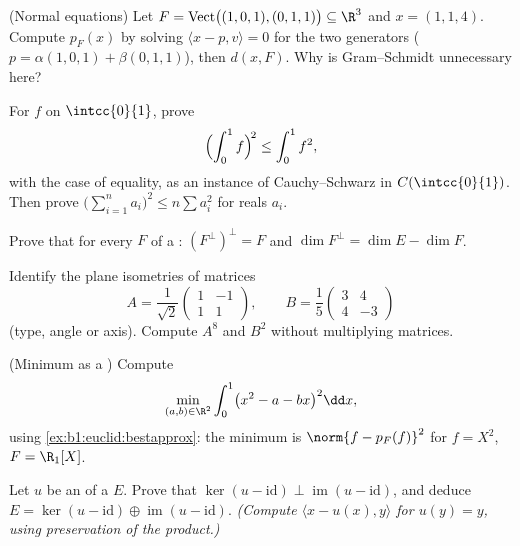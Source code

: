 \begin{exercise}[$\star\star$]\label{exo:b1:euclid:5}
(Normal equations) Let $F =
\operatorname{Vect}\bigl((1,0,1),(0,1,1)\bigr) \subseteq \R^3$ and
$x = (1, 1, 4)$. Compute $p_F(x)$ by solving $\langle x - p, v
\rangle = 0$ for the two generators ($p = \alpha(1,0,1) +
\beta(0,1,1)$), then $d(x, F)$. Why is Gram--Schmidt unnecessary
here?
\end{exercise}

\begin{exercise}[$\star\star$]\label{exo:b1:euclid:6}
For $f$  on $\intcc{0}{1}$, prove
\[
\Bigl(\int_0^1 f\Bigr)^{\!2} \leq \int_0^1 f^2 ,
\]
with the case of equality, as an instance of Cauchy--Schwarz in
$C(\intcc{0}{1})$. Then prove $\bigl(\sum_{i=1}^n a_i\bigr)^2 \leq
n \sum a_i^2$ for reals $a_i$.
\end{exercise}

\begin{exercise}[$\star\star$]\label{exo:b1:euclid:7}
Prove that for every  $F$ of a :
$(F^{\perp})^{\perp} = F$ and $\dim F^{\perp} = \dim E - \dim F$.
\end{exercise}

\begin{exercise}[$\star\star$]\label{exo:b1:euclid:8}
Identify the plane isometries of matrices
\[
A = \frac{1}{\sqrt 2}\begin{pmatrix} 1 & -1\\ 1 & 1\end{pmatrix},
\qquad
B = \frac{1}{5}\begin{pmatrix} 3 & 4\\ 4 & -3\end{pmatrix}
\]
(type, angle or axis). Compute $A^8$ and $B^2$ without
multiplying matrices.
\end{exercise}

\begin{exercise}[$\star\star\star$]\label{exo:b1:euclid:9}
(Minimum as a ) Compute
\[
\min_{(a, b) \in \R^2} \int_0^1 \bigl(x^2 - a - bx\bigr)^2 \dd x ,
\]
using \cref{ex:b1:euclid:bestapprox}: the minimum is $\norm{f -
p_F(f)}^2$ for $f = X^2$, $F = \R_1[X]$.
\end{exercise}

\begin{exercise}[$\star\star\star$]\label{exo:b1:euclid:10}
Let $u$ be an  of a  $E$. Prove that
$\ker(u - \mathrm{id}) \perp \operatorname{im}(u - \mathrm{id})$,
and deduce $E = \ker(u - \mathrm{id}) \oplus \operatorname{im}(u -
\mathrm{id})$. \emph{(Compute $\langle x - u(x), y\rangle$ for
$u(y) = y$, using preservation of the product.)}
\end{exercise}

